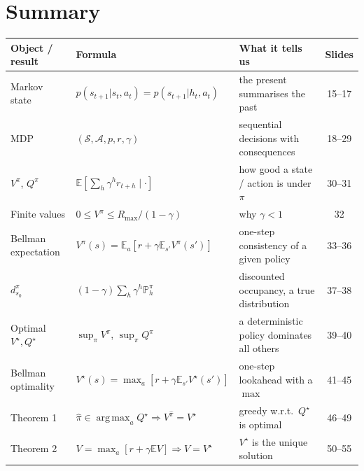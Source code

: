 \documentclass[11pt,a4paper]{article}
\newcommand{\E}{\mathbb{E}}
\newcommand{\PP}{\mathbb{P}}
\newcommand{\cS}{\mathcal{S}}
\newcommand{\cA}{\mathcal{A}}
\newcommand{\Rmax}{R_{\max}}
\DeclareMathOperator*{\argmax}{arg\,max}
\theoremstyle{plain}
\theoremstyle{definition}
\theoremstyle{remark}
\begin{document}
\section{Summary}
\begin{center}
\small
\renewcommand{\arraystretch}{1.35}
\begin{tabular}{@{}>{\raggedright\arraybackslash}p{2.9cm}>{\raggedright\arraybackslash}p{6.3cm}>{\raggedright\arraybackslash}p{4.5cm}c@{}}
\toprule
\textbf{Object / result} & \textbf{Formula} & \textbf{What it tells us} & \textbf{Slides}\\
\midrule
Markov state & $p(s_{t+1}|s_t,a_t)=p(s_{t+1}|h_t,a_t)$ & the present summarises the past & 15--17\\
MDP & $(\cS,\cA,p,r,\gamma)$ & sequential decisions with consequences & 18--29\\
$V^\pi$, $Q^\pi$ & $\E[\sum_h\gamma^hr_{t+h}\mid\cdot]$ & how good a state / action is under $\pi$ & 30--31\\
Finite values & $0\le V^\pi\le\Rmax/(1-\gamma)$ & why $\gamma<1$ & 32\\
Bellman expectation & $V^\pi(s)=\E_a[r+\gamma\E_{s'}V^\pi(s')]$ & one-step consistency of a given policy & 33--36\\
$d^\pi_{s_0}$ & $(1-\gamma)\sum_h\gamma^h\PP^\pi_h$ & discounted occupancy, a true distribution & 37--38\\
Optimal $V^\star,Q^\star$ & $\sup_\pi V^\pi$, $\sup_\pi Q^\pi$ & a deterministic policy dominates all others & 39--40\\
Bellman optimality & $V^\star(s)=\max_a[r+\gamma\E_{s'}V^\star(s')]$ & one-step lookahead with a $\max$ & 41--45\\
Theorem 1 & $\hat\pi\in\argmax_aQ^\star\Rightarrow V^{\hat\pi}=V^\star$ & greedy w.r.t.\ $Q^\star$ is optimal & 46--49\\
Theorem 2 & $V=\max_a[r+\gamma\E V]\Rightarrow V=V^\star$ & $V^\star$ is the unique solution & 50--55\\
\bottomrule
\end{tabular}
\end{center}
\end{document}
